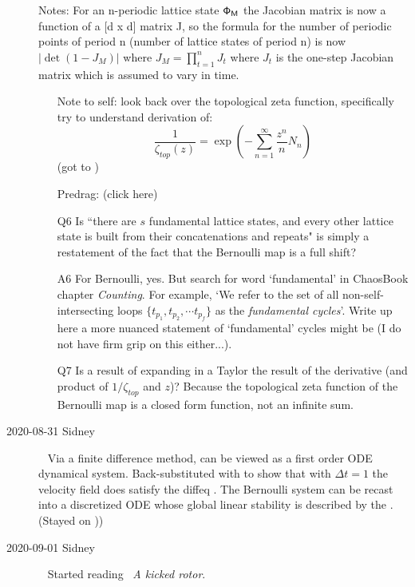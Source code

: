 \begin{description}
\vspace{3mm}

Notes: For an n-periodic lattice state $\mathsf{\Phi}_{\mathsf{M}}$ the Jacobian
matrix is now a function of a [d x d] matrix J, so the formula for the
number of periodic points of period n (number of lattice states of period
n) is now $|\det(1-J_M)|$ where $J_M=\prod^n_{t=1}J_t$ where $J_t$ is the
one-step Jacobian matrix which is assumed to vary in time.

\begin{itemize}
	\item[Note to self:]
look back over the topological zeta function, specifically try to
understand derivation of:
\[
\frac{1}{\zeta_{top}(z)}=\exp\left(-\sum^{\infty}_{n=1}\frac{z^n}{n}N_n\right)
\]
(got to )
	\item[Predrag:]
 {(click here)}
	\item[Q6]
Is ``there are ${s}$ fundamental lattice states, and every other lattice state
is built from their concatenations and repeats"
is simply a restatement of the fact that the Bernoulli map is a full shift?
	\item[A6]
For Bernoulli, yes. But search for word `fundamental' in ChaosBook
chapter 
{{\em Counting}}. For example, `We refer to the set of all
non-self-intersecting loops $\{ t_{p_1}, t_{p_2}, \cdots t_{p_f} \}$ as
the {\em fundamental cycles}'. Write up here a more nuanced statement of
`fundamental' cycles might be (I do not have firm grip on this either...).
	\item[Q7]
Is  a result of expanding in a Taylor the result of the derivative (and product of $1/\zeta_{top}$ and $z$)? Because the topological zeta function of the Bernoulli map is a closed form function, not an infinite sum.
\end{itemize}

\item[2020-08-31 Sidney]~
Via a finite difference method,  can be viewed as a
first order ODE dynamical system. Back-substituted with 
to show that with $\Delta t=1$ the velocity field does satisfy the diffeq
.
The Bernoulli system can be recast into a discretized ODE whose global
linear stability is described by the {\jacobianOrb}.
(Stayed on ))

\item[2020-09-01 Sidney]~
Started reading ~{\em A kicked rotor}.


\end{description}
